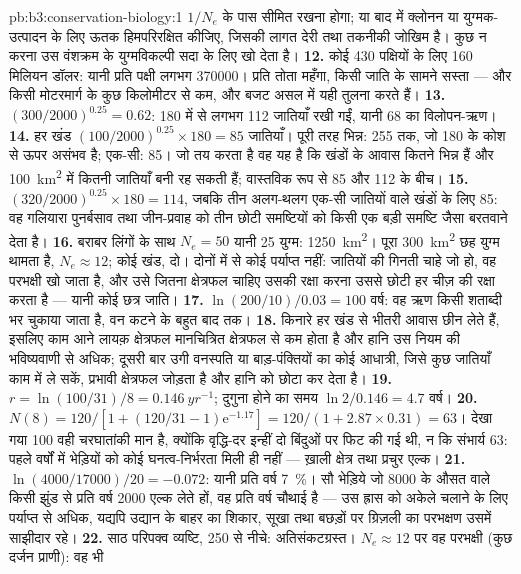 \begin{solution}{pb:b3:conservation-biology:1}
$1/N_{e}$ के पास सीमित रखना होगा; या बाद में क्लोनन या युग्मक-उत्पादन के
लिए ऊतक हिमपरिरक्षित कीजिए, जिसकी लागत देरी तथा तकनीकी जोखिम है। कुछ न
करना उस वंशक्रम के युग्मविकल्पी सदा के लिए खो देता है।
\textbf{12.} कोई 430 पक्षियों के लिए \qty{160}{} मिलियन डॉलर: यानी प्रति
पक्षी लगभग \num{370000}। प्रति तोता महँगा, किसी जाति के सामने सस्ता ---
और किसी मोटरमार्ग के कुछ किलोमीटर से कम, और बजट असल में यही तुलना करते
हैं।
\textbf{13.} $(300/2000)^{0.25} = 0.62$: 180 में से लगभग 112 जातियाँ रखी
गईं, यानी 68 का विलोपन-ऋण।
\textbf{14.} हर खंड $(100/2000)^{0.25}\times 180 = 85$ जातियाँ। पूरी तरह
भिन्न: 255 तक, जो 180 के कोश से ऊपर असंभव है; एक-सी: 85। जो तय करता है
वह यह है कि खंडों के आवास कितने भिन्न हैं और \qty{100}{km^2} में कितनी
जातियाँ बनी रह सकती हैं; वास्तविक रूप से 85 और 112 के बीच।
\textbf{15.} $(320/2000)^{0.25}\times 180 = 114$, जबकि तीन अलग-थलग एक-सी
जातियों वाले खंडों के लिए 85: वह गलियारा पुनर्बसाव तथा जीन-प्रवाह को तीन
छोटी समष्टियों को किसी एक बड़ी समष्टि जैसा बरतवाने देता है।
\textbf{16.} बराबर लिंगों के साथ $N_{e} = 50$ यानी 25 युग्म:
\qty{1250}{km^2}। पूरा \qty{300}{km^2} छह युग्म थामता है,
$N_{e} \approx 12$; कोई खंड, दो। दोनों में से कोई पर्याप्त नहीं: जातियों
की गिनती चाहे जो हो, वह परभक्षी खो जाता है, और उसे जितना क्षेत्रफल चाहिए
उसकी रक्षा करना उससे छोटी हर चीज़ की रक्षा करता है --- यानी कोई छत्र
जाति।
\textbf{17.} $\ln(200/10)/0.03 = 100$ वर्ष: वह ऋण किसी शताब्दी भर चुकाया
जाता है, वन कटने के बहुत बाद तक।
\textbf{18.} किनारे हर खंड से भीतरी आवास छीन लेते हैं, इसलिए काम आने
लायक़ क्षेत्रफल मानचित्रित क्षेत्रफल से कम होता है और हानि उस नियम की
भविष्यवाणी से अधिक; दूसरी बार उगी वनस्पति या बाड़-पंक्तियों का कोई
आधात्री, जिसे कुछ जातियाँ काम में ले सकें, प्रभावी क्षेत्रफल जोड़ता है
और हानि को छोटा कर देता है।
\textbf{19.} $r = \ln(100/31)/8 = \qty{0.146}{yr^{-1}}$; दुगुना होने का
समय $\ln 2/0.146 = 4.7$ वर्ष।
\textbf{20.} $N(8) = 120/[1 + (120/31 - 1)\mathrm{e}^{-1.17}] = 120/(1 +
2.87\times 0.31) = 63$। देखा गया 100 वही चरघातांकी मान है, क्योंकि
वृद्धि-दर इन्हीं दो बिंदुओं पर फिट की गई थी, न कि संभार्य 63: पहले
वर्षों में भेड़ियों को कोई घनत्व-निर्भरता मिली ही नहीं --- ख़ाली क्षेत्र
तथा प्रचुर एल्क।
\textbf{21.} $\ln(4000/\num{17000})/20 = -0.072$: यानी प्रति वर्ष
\qty{7}{\%}। सौ भेड़िये जो \num{8000} के औसत वाले किसी झुंड से प्रति वर्ष
\num{2000} एल्क लेते हों, वह प्रति वर्ष चौथाई है --- उस ह्रास को अकेले
चलाने के लिए पर्याप्त से अधिक, यद्यपि उद्यान के बाहर का शिकार, सूखा तथा
बछड़ों पर ग्रिज़ली का परभक्षण उसमें साझीदार रहे।
\textbf{22.} साठ परिपक्व व्यष्टि, 250 से नीचे: अतिसंकटग्रस्त।
$N_{e} \approx 12$ पर वह परभक्षी (कुछ दर्जन प्राणी): वह भी

\end{solution}
